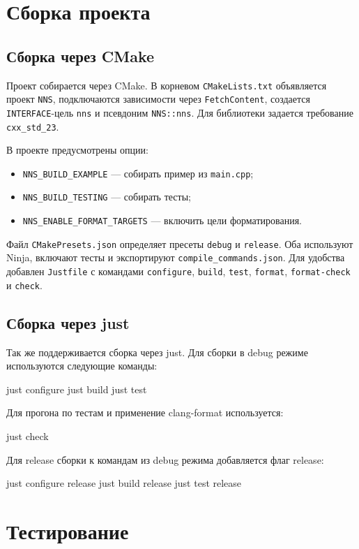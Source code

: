 \documentclass{article}
\begin{document}
\section{Сборка проекта}

\subsection{Сборка через CMake}

Проект собирается через CMake. В корневом \texttt{CMakeLists.txt}
объявляется проект \texttt{NNS}, подключаются зависимости через
\texttt{FetchContent}, создается \texttt{INTERFACE}-цель \texttt{nns}
и псевдоним \texttt{NNS::nns}. Для библиотеки задается требование
\texttt{cxx\_std\_23}.

В проекте предусмотрены опции:
\begin{itemize}
    \item \texttt{NNS\_BUILD\_EXAMPLE} --- собирать пример из
        \texttt{main.cpp}; \item \texttt{NNS\_BUILD\_TESTING} ---
        собирать тесты; \item \texttt{NNS\_ENABLE\_FORMAT\_TARGETS}
        --- включить цели форматирования.
\end{itemize}
Файл \texttt{CMakePresets.json} определяет пресеты \texttt{debug} и
\texttt{release}. Оба используют Ninja, включают тесты и экспортируют
\texttt{compile\_commands.json}. Для удобства добавлен
\texttt{Justfile} с командами \texttt{configure}, \texttt{build},
\texttt{test}, \texttt{format}, \texttt{format-check} и
\texttt{check}.

\subsection{Сборка через just}
Так же поддерживается сборка через just. Для сборки в debug режиме используются следующие команды:
\begin{cppcode}
just configure
just build
just test
\end{cppcode}
Для прогона по тестам и применение clang-format используется:
\begin{cppcode}
just check
\end{cppcode}
Для release сборки к командам из debug режима добавляется флаг release:
\begin{cppcode}
just configure release
just build release
just test release
\end{cppcode}
\section{Тестирование}
\end{document}

